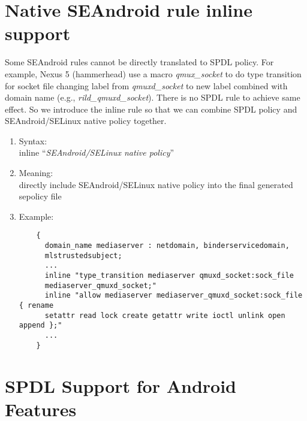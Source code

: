 \documentclass{article}
\begin{document}
\section{Native SEAndroid rule inline support}
Some SEAndroid rules cannot be directly translated to SPDL policy. For example, 
Nexus 5 (hammerhead) use a macro {\em qmux\_socket} to do type transition for 
socket file changing label from {\em qmuxd\_socket} to new label combined with 
domain name (e.g., {\em rild\_qmuxd\_socket}). There is no SPDL rule to achieve 
same effect. So we introduce the inline rule so that we can combine SPDL policy 
and SEAndroid/SELinux native policy together.
\begin{enumerate}
	\item Syntax:\\
	inline ``{\em SEAndroid/SELinux native policy}''\\
	\item Meaning:\\
	directly include SEAndroid/SELinux native policy into the final generated 
	sepolicy file
	\item Example:\\
	\begin{verbatim}
	{
	  domain_name mediaserver : netdomain, binderservicedomain, 
	  mlstrustedsubject;
	  ...
	  inline "type_transition mediaserver qmuxd_socket:sock_file 
	  mediaserver_qmuxd_socket;"
	  inline "allow mediaserver mediaserver_qmuxd_socket:sock_file { rename 
	  setattr read lock create getattr write ioctl unlink open append };"
	  ...
	}
	\end{verbatim}
\end{enumerate}

\section{SPDL Support for Android Features}
\label{sec:android_change}
\end{document}
